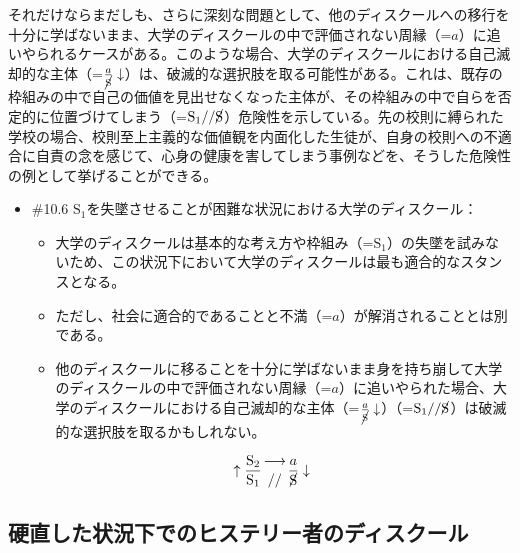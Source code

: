 それだけならまだしも、さらに深刻な問題として、他のディスクールへの移行を十分に学ばないまま、\mbox{大学のディスクール}の中で評価されない周縁（=\(a\)）に追いやられるケースがある。このような場合、\mbox{大学のディスクール}における自己滅却的な主体（=\(\frac{a}{\cancel{\textrm{S}}}\downarrow\)）は、破滅的な選択肢を取る可能性がある。これは、既存の枠組みの中で自己の価値を見出せなくなった主体が、その枠組みの中で自らを否定的に位置づけてしまう（=\(\textrm{S}_1//\cancel{\textrm{S}}\)）危険性を示している。先の校則に縛られた学校の場合、校則至上主義的な価値観を内面化した生徒が、自身の校則への不適合に自責の念を感じて、心身の健康を害してしまう事例などを、そうした危険性の例として挙げることができる。

\begin{note}{}
  \begin{itemize}
    \tightlist
    \item{\#10.6}
      $\textrm{S}_1$を失墜させることが困難な状況における\mbox{大学のディスクール}：
      \begin{itemize}
          \tightlist
          \item
          \mbox{大学のディスクール}は基本的な考え方や枠組み（=$\textrm{S}_1$）の失墜を試みないため、この状況下において\mbox{大学のディスクール}は最も適合的なスタンスとなる。
          \item
          ただし、社会に適合的であることと不満（=$a$）が解消されることとは別である。
          \item
          他のディスクールに移ることを十分に学ばないまま身を持ち崩して\mbox{大学のディスクール}の中で評価されない周縁（=$a$）に追いやられた場合、\mbox{大学のディスクール}における自己滅却的な主体（=$\frac{a}{\cancel{\textrm{S}}}\downarrow$）（=$\textrm{S}_1//\cancel{\textrm{S}}$）は破滅的な選択肢を取るかもしれない。
        \end{itemize}

$$
\uparrow\frac{\mathrm{S_2}}{\mathrm{S_1}}\genfrac{}{}{0pt}{}{\longrightarrow}{//}\frac{a}{\cancel{\textrm{S}}}\downarrow
$$
  \end{itemize}
\end{note}

\subsection{硬直した状況下でのヒステリー者のディスクール}\label{ux786cux76f4ux3057ux305fux72b6ux6cc1ux4e0bux3067ux306eux30d2ux30b9ux30c6ux30eaux30fcux8005ux306eux30c7ux30a3ux30b9ux30afux30fcux30eb}

